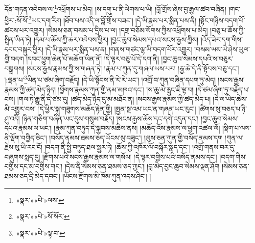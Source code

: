 དོན་གཏན་འབེབས་ལ་\footnote{«སྣར་»«པེ་»ལས་}འཕྲོགས་པ་མེད། །ས་དགུ་པ་ནི་ལེགས་པ་ཡི། །བློ་གྲོས་ཞེས་བྱ་རྒྱལ་ཚབ་བཞིན། །གང་ཕྱིར་:སོ་སོ་\footnote{«སྣར་»«པེ་»སོ་སོར་}ཡང་དག་རིག །ཐོབ་པས་འདི་ལ་བློ་གྲོས་བཟང་། །དེ་ཡི་རྣམ་པར་སྨིན་པས་ནི། །སྟོང་གཉིས་བདག་པོ་ཚངས་པར་འགྱུར། །སེམས་ཅན་བསམ་པ་དྲིས་པ་ལ། །དགྲ་བཅོམ་སོགས་ཀྱིས་འཕྲོགས་པ་མེད། །བཅུ་པ་ཆོས་ཀྱི་སྤྲིན་ཡིན་ཏེ། །དམ་པ་ཆོས་ཀྱི་ཆར་འབེབས་ཕྱིར། །བྱང་ཆུབ་སེམས་དཔའ་སངས་རྒྱས་ཀྱིས། །འོད་ཟེར་དག་གིས་དབང་བསྐུར་ཕྱིར། །དེ་ཡི་རྣམ་པར་སྨིན་པས་ན། །གནས་གཙང་ལྷ་ཡི་བདག་པོར་འགྱུར། །བསམ་ཡས་ཡེ་ཤེས་ཡུལ་གྱི་བདག །དབང་ཕྱུག་ཆེན་པོ་མཆོག་ཡིན་ནོ། །དེ་ལྟར་བཅུ་པོ་དེ་དག་ནི། །བྱང་ཆུབ་སེམས་དཔའི་ས་བཅུར་བསྒྲགས། །སངས་རྒྱས་རྣམས་ཀྱི་ས་གཞན་ཏེ། །རྣམ་པ་ཀུན་དུ་གཞལ་ཡས་པར། །རྒྱ་ཆེ་དེ་ནི་སྟོབས་བཅུ་དང་། །:ལྡན་པ་\footnote{«སྣར་»«པེ་»ལྟ་བ་}ཡིན་པ་ཙམ་ཞིག་བརྗོད། །དེ་ཡི་སྟོབས་ནི་རེ་རེ་ཡང་། །འགྲོ་བ་ཀུན་བཞིན་དཔག་ཏུ་མེད། །སངས་རྒྱས་རྣམས་ཀྱི་ཚད་མེད་ཉིད། །ཕྱོགས་རྣམས་ཀུན་གྱི་ནམ་མཁའ་དང་། །ས་ཆུ་མེ་རླུང་ཇི་ལྟ་བ། །དེ་ཙམ་ཞིག་ཏུ་བརྗོད་པ་བས། །གལ་ཏེ་རྒྱུ་ནི་དེ་ཙམ་དུ། །ཚད་མེད་ཉིད་དུ་མ་མཐོང་ན། །སངས་རྒྱས་རྣམས་ཀྱི་ཚད་མེད་པ། །དེ་ལ་ཡིད་ཆེས་མི་འགྱུར་བས། །དེ་ཕྱིར་སྐུ་གཟུགས་མཆོད་རྟེན་གྱི། །སྤྱན་སྔ་འམ་ཡང་ན་གཞན་ཡང་རུང་། །ཚིགས་སུ་བཅད་པ་ཉི་ཤུ་འདི། །ཉིན་གཅིག་བཞིན་ཡང་དུས་གསུམ་བརྗོད། །སངས་རྒྱས་ཆོས་དང་དགེ་འདུན་དང་། །བྱང་ཆུབ་སེམས་དཔའ་རྣམས་ལ་ཡང་། །རྣམ་ཀུན་བཏུད་དེ་སྐྱབས་མཆིས་ནས། །མཆོད་འོས་རྣམས་ལ་ཕྱག་འཚལ་ལོ། །སྡིག་པ་ལས་ནི་ལྡོག་བགྱིད་ཅིང་། །བསོད་ནམས་ཐམས་ཅད་ཡོངས་སུ་བཟུང་། །ལུས་ཅན་ཀུན་གྱི་བསོད་ནམས་དག །ཀུན་ལ་རྗེས་སུ་ཡི་རང་ངོ། །བདག་ནི་སྤྱི་བཏུད་ཐལ་སྦྱར་ཏེ། །ཆོས་ཀྱི་འཁོར་ལོ་བསྐོར་སླད་དང་། །འགྲོ་གནས་བར་དུ་བཞུགས་སླད་དུ། །རྫོགས་པའི་སངས་རྒྱས་རྣམས་ལ་གསོལ། །དེ་ལྟར་བགྱིས་པའི་བསོད་ནམས་དང་། །བདག་གིས་བགྱིས་དང་མ་བགྱིས་གང་། །དེས་ནི་སེམས་ཅན་ཐམས་ཅད་ཀྱང་། །བླ་མེད་བྱང་ཆུབ་སེམས་ལྡན་ཤོག །སེམས་ཅན་ཐམས་ཅད་དྲི་མེད་དབང་། །ཡོངས་རྫོགས་མི་ཁོམ་ཀུན་འདས་ཤིང་། །
